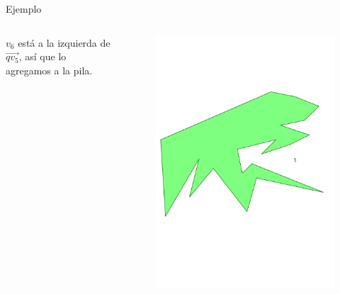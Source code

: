 \documentclass[aspectratio=169,xcolor=dvipsnames, t]{beamer}
\begin{document}
\begin{frame}{Ejemplo}
  \begin{columns}
    \begin{column}{0.3\textwidth}
      \raggedright %
      $v_{6}$ está a la izquierda de $\overrightarrow{qv_{5}}$, así que lo agregamos a la pila.
    \end{column}
    \begin{column}{0.7\textwidth}
      \vspace{-2.5cm} %
      \begin{figure}
        \centering
        \includegraphics[width=1\linewidth, height=.95\textheight, page=18, keepaspectratio]{IPE/point_visibility.pdf}
      \end{figure}
    \end{column}
  \end{columns}
\end{frame}
\end{document}
